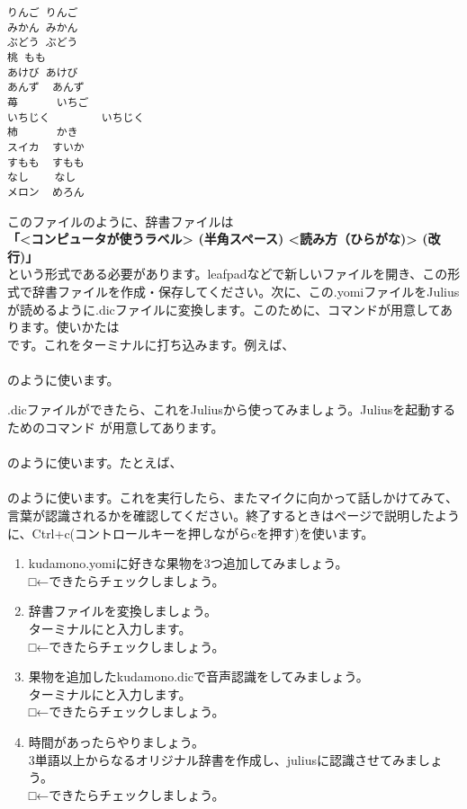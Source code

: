 \begin{lstlisting}[caption=kudamino.yomi,label=kudamino.yomi]
りんご りんご
みかん みかん
ぶどう ぶどう
桃 もも
あけび あけび
あんず  あんず
苺      いちご
いちじく        いちじく
柿      かき
スイカ  すいか
すもも  すもも
なし    なし
メロン  めろん
\end{lstlisting}

このファイルのように、辞書ファイルは\\
\textbf{「<コンピュータが使うラベル> (半角スペース) <読み方（ひらがな)> (改行)」}\\
という形式である必要があります。leafpadなどで新しいファイルを開き、この形式で辞書ファイルを作成・保存してください。次に、この.yomiファイルをJuliusが読めるように.dicファイルに変換します。このために、コマンドが用意してあります。使いかたは\\
です。これをターミナルに打ち込みます。例えば、\\
\\
のように使います。

.dicファイルができたら、これをJuliusから使ってみましょう。Juliusを起動するためのコマンド  が用意してあります。\\
\\
のように使います。たとえば、\\
\\
のように使います。これを実行したら、またマイクに向かって話しかけてみて、言葉が認識されるかを確認してください。終了するときは\pageref{Julius}ページで説明したように、Ctrl+c(コントロールキーを押しながらcを押す)を使います。

\begin{tcolorbox}[title=\useOmetoi]
\begin{enumerate}
\item kudamono.yomiに好きな果物を3つ追加してみましょう。\\□←できたらチェックしましょう。
\item 辞書ファイルを変換しましょう。\\ターミナルにと入力します。\\□←できたらチェックしましょう。
\item 果物を追加したkudamono.dicで音声認識をしてみましょう。\\ターミナルにと入力します。\\□←できたらチェックしましょう。
\item 時間があったらやりましょう。\\3単語以上からなるオリジナル辞書を作成し、juliusに認識させてみましょう。\\□←できたらチェックしましょう。
\end{enumerate}
\end{tcolorbox}
